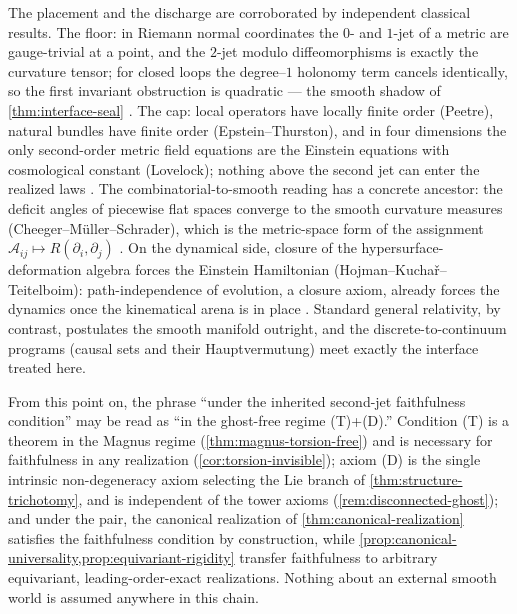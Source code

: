 \begin{remark}
	\label{rem:external-certifications}
	The placement and the discharge are corroborated by independent
	classical results.  The floor: in Riemann normal coordinates the
	\(0\)- and \(1\)-jet of a metric are gauge-trivial at a point, and
	the \(2\)-jet modulo diffeomorphisms is exactly the curvature
	tensor; for closed loops the degree--\(1\) holonomy term cancels
	identically, so the first invariant obstruction is quadratic ---
	the smooth shadow of \cref{thm:interface-seal}
	\cite{KobayashiNomizu1963,Wald1984}.  The cap: local
	operators have locally finite order (Peetre), natural bundles have
	finite order (Epstein--Thurston), and in four dimensions the only
	second-order metric field equations are the Einstein equations with
	cosmological constant (Lovelock); nothing above the second jet can
	enter the realized laws \cite{Peetre1959,EpsteinThurston1979,Lovelock1971}.
	The combinatorial-to-smooth reading has a
	concrete ancestor: the deficit angles of piecewise flat spaces
	converge to the smooth curvature measures
	(Cheeger--M\"uller--Schrader), which is the metric-space form of the
	assignment \(\mathcal A_{ij}\mapsto R(\partial_i,\partial_j)\)
	\cite{CheegerMullerSchrader1984}.  On
	the dynamical side, closure of the hypersurface-deformation algebra
	forces the Einstein Hamiltonian
	(Hojman--Kucha\v{r}--Teitelboim): path-independence of evolution,
	a closure axiom, already forces the dynamics once the kinematical
	arena is in place \cite{HojmanKucharTeitelboim1976}.  Standard general relativity, by contrast,
	postulates the smooth manifold outright, and the discrete-to-continuum
	programs (causal sets and their Hauptvermutung) meet exactly the
	interface treated here.
\end{remark}
\begin{remark}
	\label{rem:ghost-free-reading}
	From this point on, the phrase ``under the inherited second-jet
	faithfulness condition'' may be read as ``in the ghost-free regime
	\textup{(T)}+\textup{(D)}.''  Condition \textup{(T)} is a theorem in
	the Magnus regime (\cref{thm:magnus-torsion-free}) and is necessary
	for faithfulness in any realization
	(\cref{cor:torsion-invisible}); axiom \textup{(D)} is the single
	intrinsic non-degeneracy axiom selecting the Lie branch of
	\cref{thm:structure-trichotomy}, and is independent of the tower
	axioms (\cref{rem:disconnected-ghost}); and under the pair, the
	canonical realization of \cref{thm:canonical-realization} satisfies
	the faithfulness condition by construction, while
	\cref{prop:canonical-universality,prop:equivariant-rigidity} transfer
	faithfulness to arbitrary equivariant, leading-order-exact
	realizations.  Nothing about an external smooth world is assumed
	anywhere in this chain.
\end{remark}
